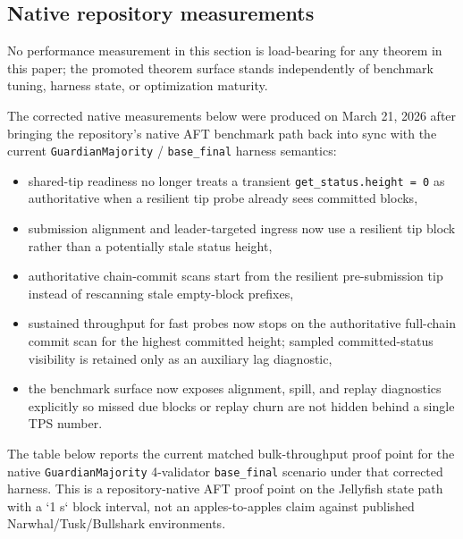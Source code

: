 \documentclass[11pt]{article}
\newcommand{\code}[1]{\texttt{#1}}
\begin{document}
\subsection{Native repository measurements}

No performance measurement in this section is load-bearing for any theorem in
this paper; the promoted theorem surface stands independently of benchmark
tuning, harness state, or optimization maturity.

The corrected native measurements below were produced on March 21, 2026 after
bringing the repository's native AFT benchmark path back into sync with the
current \code{GuardianMajority} / \code{base\_final} harness semantics:

\begin{itemize}[leftmargin=1.5em]
\item shared-tip readiness no longer treats a transient
\code{get\_status.height = 0} as authoritative when a resilient tip probe
already sees committed blocks,
\item submission alignment and leader-targeted ingress now use a resilient tip
block rather than a potentially stale status height,
\item authoritative chain-commit scans start from the resilient
pre-submission tip instead of rescanning stale empty-block prefixes,
\item sustained throughput for fast probes now stops on the authoritative
full-chain commit scan for the highest committed height; sampled committed-status
visibility is retained only as an auxiliary lag diagnostic,
\item the benchmark surface now exposes alignment, spill, and replay
diagnostics explicitly so missed due blocks or replay churn are not hidden
behind a single TPS number.
\end{itemize}

The table below reports the current matched bulk-throughput proof point for the
native \code{GuardianMajority} 4-validator \code{base\_final} scenario under
that corrected harness. This is a repository-native AFT proof point on the
Jellyfish state path with a `1 s` block interval, not an apples-to-apples claim
against published Narwhal/Tusk/Bullshark environments.

\begin{center}
\scriptsize
{}
\end{center}
\end{document}
